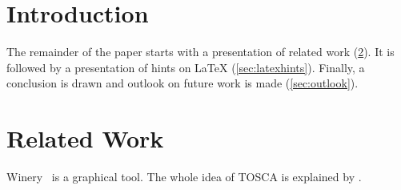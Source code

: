 
%
%

\begin{abstract}
\lipsum[1]

\end{abstract}

%
\section{Introduction}
\label{sec:introduction}
\lipsum[1-3]

The remainder of the paper starts with a presentation of related work (\cref{sec:relatedwork}).
It is followed by a presentation of hints on \LaTeX{} (\cref{sec:latexhints}).
Finally, a conclusion is drawn and outlook on future work is made (\cref{sec:outlook}).

\section{Related Work}
\label{sec:relatedwork}

Winery~\cite{Winery} is a graphical  tool.
The whole idea of TOSCA is explained by \citet{Binz2009}.

